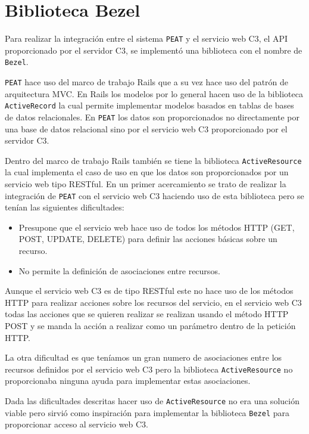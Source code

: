 \section{Biblioteca Bezel}

Para realizar la integración entre el sistema \texttt{PEAT} y el servicio web C3,
el API proporcionado por el servidor C3, se implementó una biblioteca con el nombre
de \texttt{Bezel}.

\texttt{PEAT} hace uso del marco de trabajo Rails que a su vez hace
uso del patrón de arquitectura MVC. En Rails los modelos por lo general hacen uso
de la biblioteca \texttt{ActiveRecord} la cual permite implementar modelos basados
en tablas de bases de datos relacionales. En \texttt{PEAT} los datos
son proporcionados no directamente por una base de datos relacional sino por
el servicio web C3 proporcionado por el servidor C3.

Dentro del marco de trabajo Rails también se tiene la biblioteca
\texttt{ActiveResource} la cual implementa el caso de uso en que los datos son
proporcionados por un servicio web tipo RESTful. En un primer acercamiento se trato
de realizar la integración de \texttt{PEAT} con el servicio web C3 haciendo uso de
esta biblioteca pero se tenían las siguientes dificultades:

\begin{itemize}
\item Presupone que el servicio web hace uso de todos los métodos HTTP (GET, POST,
  UPDATE, DELETE) para definir las acciones básicas sobre un recurso.
\item No permite la definición de asociaciones entre recursos.
\end{itemize}

Aunque el servicio web C3 es de tipo RESTful este no hace uso de los métodos
HTTP para realizar acciones sobre los recursos del servicio, en el servicio web
C3 todas las acciones que se quieren realizar se realizan usando el método HTTP
POST y se manda la acción a realizar como un parámetro dentro de la petición HTTP.

La otra dificultad es que teníamos un gran numero de asociaciones entre los
recursos definidos por el servicio web C3 pero la biblioteca \texttt{ActiveResource}
no proporcionaba ninguna ayuda para implementar estas asociaciones.

Dada las dificultades descritas hacer uso de \texttt{ActiveResource} no era una
solución viable pero sirvió como inspiración para implementar la biblioteca
\texttt{Bezel} para proporcionar acceso al servicio web C3.

